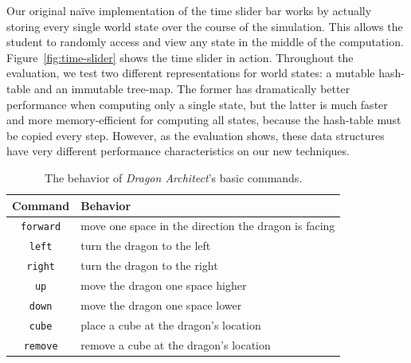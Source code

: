 \documentclass{sig-alternate}
\newcommand{\da}{\emph{Dragon Architect}}
\begin{document}
Our original na\"{i}ve implementation of the time slider bar works by actually storing every single world state over the course of the simulation. This allows the student to randomly access and view any state in the middle of the computation. Figure~\ref{fig:time-slider} shows the time slider in action. Throughout the evaluation, we test two different representations for world states: a mutable hash-table and an immutable tree-map. The former has dramatically better performance when computing only a single state, but the latter is much faster and more memory-efficient for computing all states, because the hash-table must be copied every step. However, as the evaluation shows, these data structures have very different performance characteristics on our new techniques.

\begin{table}[ht!]
  \centering
  \begin{tabular}{|c|p{6cm}|}
    \hline
    Command & Behavior \\\hline
    \texttt{forward} & move one space in the direction the dragon is facing \\\hline
    \texttt{left} & turn the dragon to the left \\\hline
    \texttt{right} & turn the dragon to the right \\\hline
    \texttt{up} & move the dragon one space higher \\\hline
    \texttt{down} & move the dragon one space lower \\\hline
    \texttt{cube} & place a cube at the dragon's location \\\hline
    \texttt{remove} & remove a cube at the dragon's location \\\hline
  \end{tabular}
  \caption{The behavior of \da{}'s basic commands.}
  \label{tab:commands}
\end{table}
\end{document}
